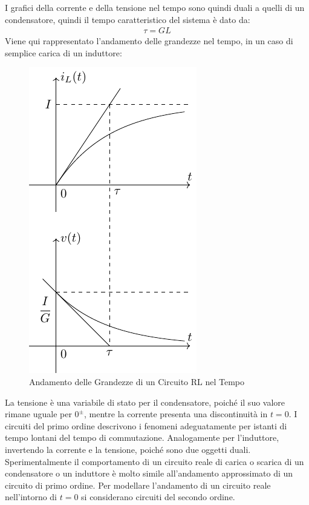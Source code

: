 \documentclass{article}
\numberwithin{equation}{subsection}
\begin{document}
I grafici della corrente e della tensione nel tempo sono quindi duali a quelli di un condensatore, quindi il tempo caratteristico del sistema è dato da:
\begin{gather*}
    \tau=GL
\end{gather*}
Viene qui rappresentato l'andamento delle grandezze nel tempo, in un caso di semplice carica di un induttore:
\begin{figure}[ht]%
    \centering
    \includegraphics{andamento-circuito-rl.pdf}
    \caption{Andamento delle Grandezze di un Circuito RL nel Tempo}
    \label{fig:andamento-circuito-rl}
\end{figure}


La tensione è una variabile di stato per il condensatore, poiché il suo valore rimane uguale per $0^{\pm}$, mentre la corrente presenta una discontinuità in $t=0$. I 
circuiti del primo ordine descrivono i fenomeni adeguatamente per istanti di tempo lontani del tempo di commutazione. %
Analogamente per l'induttore, invertendo la corrente e la tensione, poiché sono due oggetti duali. 
Sperimentalmente il comportamento di un circuito reale di carica o scarica di un condensatore o un induttore è molto simile all'andamento approssimato di un circuito di primo 
ordine. Per modellare l'andamento di un circuito reale nell'intorno di $t=0$ si considerano circuiti del secondo ordine. 
\end{document}
